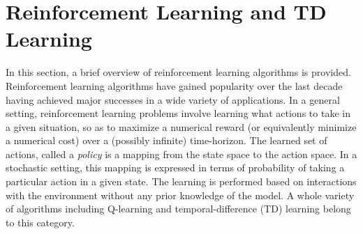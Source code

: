 

\section{Reinforcement Learning and TD Learning}
\label{rl_td}
In this section, a brief overview of reinforcement learning algorithms is provided. Reinforcement learning algorithms have gained popularity over the last decade having achieved major successes in a wide variety of applications. In a general setting, reinforcement learning problems involve learning what actions to take in a given situation, so as to maximize a numerical reward (or equivalently minimize a numerical cost) over a (possibly infinite) time-horizon. The learned set of actions, called a \textit{policy} is a mapping from the state space to the action space. In a stochastic setting, this mapping is expressed in terms of probability of taking a particular action in a given state. The learning is performed based on interactions with the environment without any prior knowledge of the model. A whole variety of algorithms including Q-learning \cite{watday92a} and temporal-difference (TD) learning \cite{sut88} belong to this category. 


